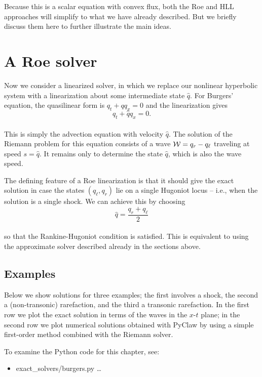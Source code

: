 \documentclass{SIAMbook2016}
\providecommand{\tightlist}{%
      \setlength{\itemsep}{0pt}\setlength{\parskip}{0pt}}
\begin{document}
Because this is a scalar equation with convex flux, both the Roe and HLL
approaches will simplify to what we have already described. But we
briefly discuss them here to further illustrate the main ideas.

\hypertarget{a-roe-solver}{%
\section{A Roe solver}\label{a-roe-solver}}

Now we consider a linearized solver, in which we replace our nonlinear
hyperbolic system with a linearization about some intermediate state
\(\hat{q}\). For Burgers' equation, the quasilinear form is
\(q_t + q q_x = 0\) and the linearization gives\\
\[q_t + \hat{q}q_x = 0.\]\\
This is simply the advection equation with velocity \(\hat{q}\). The
solution of the Riemann problem for this equation consists of a wave
\({\cal W} = q_r - q_\ell\) traveling at speed \(s = \hat{q}\). It
remains only to determine the state \(\hat{q}\), which is also the wave
speed.

The defining feature of a Roe linearization is that it should give the
exact solution in case the states \((q_\ell, q_r)\) lie on a single
Hugoniot locus -- i.e., when the solution is a single shock. We can
achieve this by choosing\\
\[\hat{q} = \frac{q_r + q_\ell}{2}\]\\
so that the Rankine-Hugoniot condition is satisfied. This is equivalent
to using the approximate solver described already in the sections above.

\hypertarget{examples}{%
\subsection{Examples}\label{examples}}

Below we show solutions for three examples; the first involves a shock,
the second a (non-transonic) rarefaction, and the third a transonic
rarefaction. In the first row we plot the exact solution in terms of the
waves in the \(x\)-\(t\) plane; in the second row we plot numerical
solutions obtained with PyClaw by using a simple first-order method
combined with the Riemann solver.

To examine the Python code for this chapter, see:

\begin{itemize}
\tightlist
\item
  {exact\_solvers/burgers.py} \ldots{}
\end{itemize}
\end{document}
